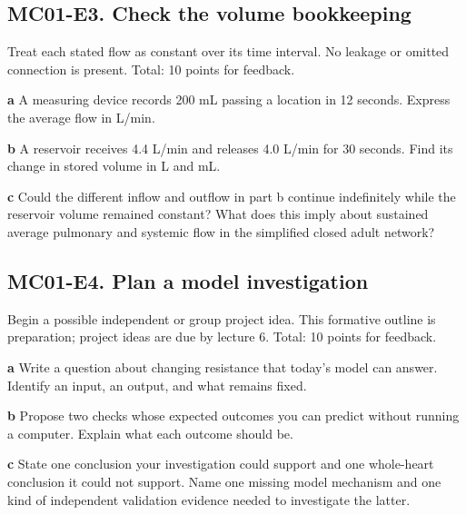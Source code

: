 \documentclass[11pt,letterpaper]{article}
\theoremstyle{definition}\newtheorem{definition}{Definition}\newtheorem{example}{Example}
\numberwithin{equation}{section}
\begin{document}
\par\noindent\begin{minipage}{\linewidth}
\subsection*{MC01-E3. Check the volume bookkeeping}
Treat each stated flow as constant over its time interval. No leakage or omitted connection is present. Total: 10 points for feedback.

\textbf{a} A measuring device records 200 mL passing a location in 12 seconds. Express the average flow in L/min.

\end{minipage}\par\medskip
\textbf{b} A reservoir receives 4.4 L/min and releases 4.0 L/min for 30 seconds. Find its change in stored volume in L and mL.

\textbf{c} Could the different inflow and outflow in part b continue indefinitely while the reservoir volume remained constant? What does this imply about sustained average pulmonary and systemic flow in the simplified closed adult network?

\par\noindent\begin{minipage}{\linewidth}
\subsection*{MC01-E4. Plan a model investigation}
Begin a possible independent or group project idea. This formative outline is preparation; project ideas are due by lecture 6. Total: 10 points for feedback.

\textbf{a} Write a question about changing resistance that today's model can answer. Identify an input, an output, and what remains fixed.

\end{minipage}\par\medskip
\textbf{b} Propose two checks whose expected outcomes you can predict without running a computer. Explain what each outcome should be.

\textbf{c} State one conclusion your investigation could support and one whole-heart conclusion it could not support. Name one missing model mechanism and one kind of independent validation evidence needed to investigate the latter.
\end{document}

